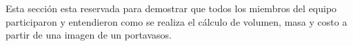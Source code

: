 
\tab Esta sección esta reservada para demostrar que todos los miembros del equipo participaron y entendieron como se realiza el cálculo de volumen, masa y costo a partir de una imagen de un portavasos. 